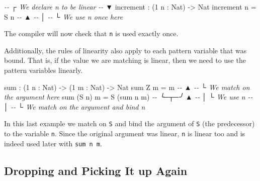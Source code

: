 \documentclass[
]{article}
\newenvironment{Shaded}{}{}
\newcommand{\CommentTok}[1]{\textcolor[rgb]{0.38,0.63,0.69}{\textit{#1}}}
\newcommand{\DataTypeTok}[1]{\textcolor[rgb]{0.56,0.13,0.00}{#1}}
\newcommand{\DecValTok}[1]{\textcolor[rgb]{0.25,0.63,0.44}{#1}}
\newcommand{\FunctionTok}[1]{\textcolor[rgb]{0.02,0.16,0.49}{#1}}
\newcommand{\NormalTok}[1]{#1}
\newcommand{\OperatorTok}[1]{\textcolor[rgb]{0.40,0.40,0.40}{#1}}
\newcommand{\OtherTok}[1]{\textcolor[rgb]{0.00,0.44,0.13}{#1}}
\begin{document}
\begin{Shaded}
\begin{Highlighting}[]
\CommentTok{{-}{-}           ┌ We declare \textasciigrave{}n\textasciigrave{} to be linear}
\CommentTok{{-}{-}           ▼}
\NormalTok{increment }\OperatorTok{:}\NormalTok{ (}\DecValTok{1}\NormalTok{ n }\OperatorTok{:} \DataTypeTok{Nat}\NormalTok{) }\OtherTok{{-}\textgreater{}} \DataTypeTok{Nat}
\NormalTok{increment n }\OtherTok{=} \DataTypeTok{S}\NormalTok{ n}
\CommentTok{{-}{-}              ▲}
\CommentTok{{-}{-}              │}
\CommentTok{{-}{-}              └ We use n once here}
\end{Highlighting}
\end{Shaded}

The compiler will now check that \texttt{n} is used exactly once.

Additionally, the rules of linearity also apply to each pattern variable
that was bound. That is, if the value we are matching is linear, then we
need to use the pattern variables linearly.

\begin{Shaded}
\begin{Highlighting}[]
\FunctionTok{sum} \OperatorTok{:}\NormalTok{ (}\DecValTok{1}\NormalTok{ n }\OperatorTok{:} \DataTypeTok{Nat}\NormalTok{) }\OtherTok{{-}\textgreater{}}\NormalTok{ (}\DecValTok{1}\NormalTok{ m }\OperatorTok{:} \DataTypeTok{Nat}\NormalTok{) }\OtherTok{{-}\textgreater{}} \DataTypeTok{Nat}
\FunctionTok{sum} \DataTypeTok{Z}\NormalTok{ m }\OtherTok{=}\NormalTok{ m}
\CommentTok{{-}{-}  ▲}
\CommentTok{{-}{-}  └ We match on the argument here}
\FunctionTok{sum}\NormalTok{ (}\DataTypeTok{S}\NormalTok{ n) m }\OtherTok{=} \DataTypeTok{S}\NormalTok{ (}\FunctionTok{sum}\NormalTok{ n m)}
\CommentTok{{-}{-}  ╰─┬─╯            ▲}
\CommentTok{{-}{-}    │              └ We use \textasciigrave{}n\textasciigrave{}}
\CommentTok{{-}{-}    │}
\CommentTok{{-}{-}    └ We match on the argument and bind \textasciigrave{}n\textasciigrave{}}
\end{Highlighting}
\end{Shaded}

In this last example we match on \texttt{S} and bind the argument of
\texttt{S} (the predecessor) to the variable \texttt{n}. Since the
original argument was linear, \texttt{n} is linear too and is indeed
used later with \texttt{sum\ n\ m}.

\hypertarget{dropping-and-picking-it-up-again}{%
\subsection{Dropping and Picking It up
Again}\label{dropping-and-picking-it-up-again}}
\end{document}

